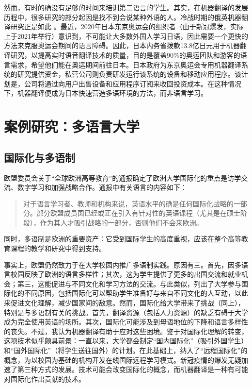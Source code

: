 \documentclass[output=paper]{langscibook}
\begin{document}
‌然而，有时的确没有足够的时间来培训第二语言的学生。‌其实，在机器翻译的发展历程中，很多研究的部分起因是找不到会说某种外语的人。‌冷战时期的俄英机器翻译研究正是如此 \citep{Gordin2016}。最近，2020年日本东京奥运会的组织者（由于新冠爆发，实际上于2021年举行）意识到，不可能让大多数外国人学习日语，因此需要一个更快的方法来克服奥运会期间的语言障碍。‌因此，日本内务省拨款13.8亿日元用于机器翻译研究，以提高实时语音翻译技术的质量，目的是覆盖90\%的奥运团队和游客的语言需求，希望他们能在奥运期间前往日本\citep{Murai2015}。‌日本政府为东京奥运会专用机器翻译系统的研究提供资金，私营公司则负责研发运行该系统的设备和移动应用程序。‌该计划是，公司将通过向用户出售设备和应用程序订阅来收回投资成本。‌在这种情况下，机器翻译便成为日本快速营造多语环境的方法，而非语言学习。

\section{案例研究：多语言大学}
\subsection{‌‌国际化与多语制}
欧盟委员会关于“全球欧洲高等教育”的通报确定了欧洲大学国际化的重点是‌访学交流、数字学习和加强战略合作。‌‌通报中有关语言的内容如下：

\begin{quote}
‌对于语言学习者、教师和机构来说，英语水平的确是任何国际化战略的一部分。部分欧盟成员国已经或正在引入有针对性的英语课程（尤其是在硕士阶段），作为其人才吸引战略的一部分，否则他们不会来欧洲。\citep{EuropeanCommission2013}
\end{quote}
    
\begin{sloppypar}
‌同时，多语制是欧洲的重要资产：它受到国际学生的高度重视，应该在整个高等教育课程的教学和研究中得到支持\citep{EuropeanCommission2013}。
\end{sloppypar}

事实上，欧盟仍然致力于在大学校园内推广多语制实践。原因有三。首先，因多语言校园反映了欧洲的语言多样性；其次，这为学生提供了更多的出国交流和就业机会；第三，这能促进与不同文化和学习方法的交流。与此类似，\citet{Gao2019}列出了大学参与国际化的不同原因，包括国际化可以帮助学生准备好与来自不同文化的人互动，以此来促进文化理解，减少国家间的敌意。‌然而，国际化给大学带来了挑战（同上），特别是与多语制有关的挑战。‌首先，翻译资源（包括人力资源）的缺乏有碍于大学成为完全使用英语的场所。其次，国际化可能涉及到母语地位的下降和语言多样性的丧失。‌不过，我认为机器翻译有助于应对这些困境。‌鉴于对国际化理解的转变，这项技术似乎颇具前景：一直以来，大学都会制定“国内国际化”（吸引外国学生）和“国外国际化”（将学生送往国外）的计划。在此基础上，\citet{MittelmeierRaghuram2020}纳入了“远程国际化”的概念，为以校园为基础的机构开发在线国际远程学习模式。‌‌新冠疫情的爆发无疑加速了第三种方式的发展。技术可能会改变国际化的概念，而机器翻译是一种有可能对国际化作出贡献的技术。
\end{document}
